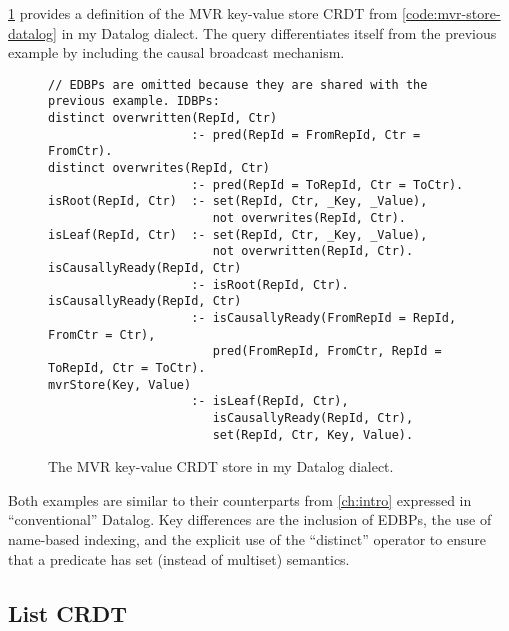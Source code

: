 \ref{code:mvr-crdt-datalog-dialect} provides a definition of the \ac{MVR}
key-value store \ac{CRDT} from \ref{code:mvr-store-datalog} in my Datalog dialect.
The query differentiates itself from the previous example by including the
causal broadcast mechanism.

\begin{figure}[htpb]
	\begin{lstlisting}[keepspaces]
// EDBPs are omitted because they are shared with the previous example. IDBPs:
distinct overwritten(RepId, Ctr)
                    :- pred(RepId = FromRepId, Ctr = FromCtr).
distinct overwrites(RepId, Ctr)
                    :- pred(RepId = ToRepId, Ctr = ToCtr).
isRoot(RepId, Ctr)  :- set(RepId, Ctr, _Key, _Value),
                       not overwrites(RepId, Ctr).
isLeaf(RepId, Ctr)  :- set(RepId, Ctr, _Key, _Value),
                       not overwritten(RepId, Ctr).
isCausallyReady(RepId, Ctr)
                    :- isRoot(RepId, Ctr).
isCausallyReady(RepId, Ctr)
                    :- isCausallyReady(FromRepId = RepId, FromCtr = Ctr),
                       pred(FromRepId, FromCtr, RepId = ToRepId, Ctr = ToCtr).
mvrStore(Key, Value)
                    :- isLeaf(RepId, Ctr),
                       isCausallyReady(RepId, Ctr),
                       set(RepId, Ctr, Key, Value).\end{lstlisting}
	\caption{The \ac{MVR} key-value \ac{CRDT} store in my Datalog dialect.}\label{code:mvr-crdt-datalog-dialect}
\end{figure}

Both examples are similar to their counterparts from \ref{ch:intro}
expressed in ``conventional'' Datalog.
Key differences are the inclusion of \acp{EDBP}, the use of name-based indexing,
and the explicit use of the ``distinct'' operator to ensure that a predicate
has set (instead of multiset) semantics.

\subsection{List \ac{CRDT}}\label{sec:list-crdt-datalog-dialect}

